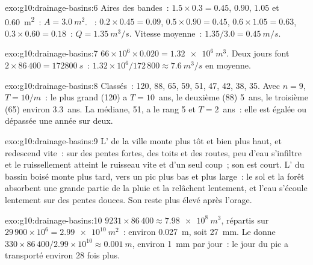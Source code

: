 \begin{solution}{exo:g10:drainage-basins:6}
Aires des bandes~: $1.5 \times 0.3 = 0.45$, $0.90$, $1.05$ et \qty{0.60}{m^2}~:
$A = \qty{3.0}{m^2}$. ~: $0.2 \times 0.45 = 0.09$, $0.5 \times 0.90
= 0.45$, $0.6 \times 1.05 = 0.63$, $0.3 \times 0.60 = 0.18$~: $Q =
\qty{1.35}{m^3/s}$. Vitesse moyenne~: $1.35/3.0 = \qty{0.45}{m/s}$.
\end{solution}

\begin{solution}{exo:g10:drainage-basins:7}
$66 \times 10^6 \times 0.020 = \qty{1.32e6}{m^3}$. Deux jours font
$2 \times 86\,400 = \qty{172800}{s}$~: $1.32 \times 10^6/172\,800 \approx
\qty{7.6}{m^3/s}$ en moyenne.
\end{solution}

\begin{solution}{exo:g10:drainage-basins:8}
Classés~: 120, 88, 65, 59, 51, 47, 42, 38, 35. Avec $n = 9$, $T = 10/m$~: le
plus grand (120) a $T = 10$~ans, le deuxième (88) 5~ans, le troisième (65)
environ 3.3~ans. La médiane, 51, a le rang 5 et $T = 2$~ans~: elle est
égalée ou dépassée une année sur deux.
\end{solution}

\begin{solution}{exo:g10:drainage-basins:9}
L' de la ville monte plus tôt et bien plus haut, et redescend
vite~: sur des pentes fortes, des toits et des routes, peu d'eau s'infiltre
et le ruissellement atteint le ruisseau vite et d'un seul coup~; son  est court. L' du bassin boisé monte plus tard, vers un
pic plus bas et plus large~: le sol et la forêt absorbent une grande partie
de la pluie et la relâchent lentement, et l'eau s'écoule lentement sur des
pentes douces. Son  reste plus élevé après l'orage.
\end{solution}

\begin{solution}{exo:g10:drainage-basins:10}
$9231 \times 86\,400 \approx \qty{7.98e8}{m^3}$, répartis sur
$29\,900 \times 10^6 = \qty{2.99e10}{m^2}$~: environ \qty{0.027}{m}, soit
\qty{27}{mm}. Le  donne $330 \times 86\,400/2.99 \times 10^{10}
\approx \qty{0.001}{m}$, environ \qty{1}{mm} par jour~: le jour du pic a
transporté environ 28 fois plus.
\end{solution}

